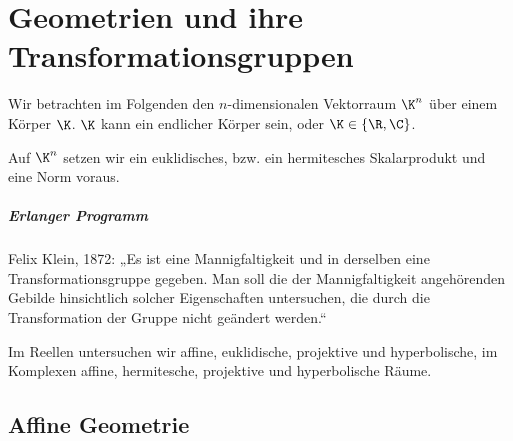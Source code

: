 \chapter{Geometrien und ihre Transformationsgruppen} \label{chap:1}


Wir betrachten im Folgenden den $n$-dimensionalen Vektorraum $\K^n$ über einem Körper $\K$.
$\K$ kann ein endlicher Körper sein, oder $\K \in \{\R, \C\}$.

Auf $\K^n$ setzen wir ein euklidisches, bzw. ein hermitesches Skalarprodukt und eine Norm voraus.

\paragraph{Erlanger Programm}

Felix Klein, 1872: „Es ist eine Mannigfaltigkeit und in derselben eine Transformationsgruppe gegeben.
Man soll die der Mannigfaltigkeit angehörenden Gebilde hinsichtlich solcher Eigenschaften untersuchen, die durch die Transformation der Gruppe nicht geändert werden.“

Im Reellen untersuchen wir affine, euklidische, projektive und hyperbolische, im Komplexen affine, hermitesche, projektive und hyperbolische Räume.


\section{Affine Geometrie}


